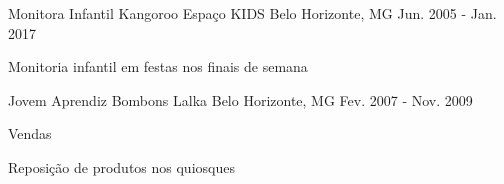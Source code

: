 
  \cventry
    {Monitora Infantil}
    {Kangoroo Espaço KIDS}
    {Belo Horizonte, MG}
    {Jun. 2005 - Jan. 2017}
    {
      \begin{cvitems}
        \item {Monitoria infantil em festas nos finais de semana}
      \end{cvitems}
    }

  \cventry
    {Jovem Aprendiz}
    {Bombons Lalka}
    {Belo Horizonte, MG}
    {Fev. 2007 - Nov. 2009}
    {
      \begin{cvitems}
        \item {Vendas}
        \item {Reposição de produtos nos quiosques}
      \end{cvitems}
    }
